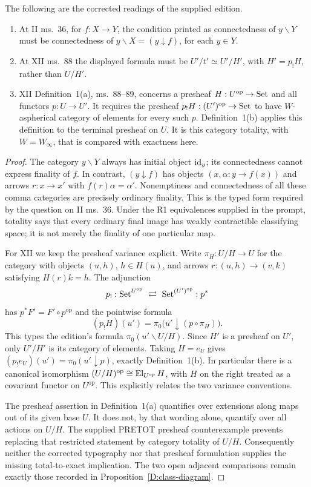 \begin{proposition}
\label{D:manuscript-types}
The following are the corrected readings of the supplied edition.
\begin{enumerate}[label=(\roman*)]
\item At II ms.\ 36, for $f:X\to Y$, the condition printed as
connectedness of $y\backslash Y$ must be connectedness of
$y\backslash X=(y\downarrow f)$, for each $y\in Y$.
\item At XII ms.\ 88 the displayed formula must be
$U'/t'\simeq U'/H'$, with $H'=p_!H$, rather than $U/H'$.
\item XII Definition~1(a), ms.\ 88--89, concerns a presheaf
$H:U^{\mathrm{op}}\to\mathrm{Set}$ and all functors $p:U\to U'$.
It requires the presheaf $p_!H:(U')^{\mathrm{op}}\to\mathrm{Set}$ to
have $W$-aspherical category of elements for every such $p$.
Definition~1(b) applies this definition to the terminal presheaf
on $U$. It is this category totality, with $W=W_\infty$, that
is compared with exactness here.
\end{enumerate}
\end{proposition}
\begin{proof}
The category $y\backslash Y$ always has initial object $\operatorname{id}_y$;
its connectedness cannot express finality of $f$. In contrast,
$(y\downarrow f)$ has objects $(x,\alpha:y\to f(x))$ and arrows
$r:x\to x'$ with $f(r)\alpha=\alpha'$. Nonemptiness and
connectedness of all these comma categories are precisely ordinary
finality. This is the typed form required by the question on
II ms.\ 36. Under the R1 equivalences supplied in the prompt,
totality says that every ordinary final image has weakly
contractible classifying space; it is not merely the finality of
one particular map.

For XII we keep the presheaf variance explicit. Write
$\pi_H:U/H\to U$ for the category with objects $(u,h)$,
$h\in H(u)$, and arrows $r:(u,h)\to(v,k)$ satisfying
$H(r)k=h$. The adjunction
\[
 p_!:\mathrm{Set}^{U^{\mathrm{op}}}
 \ \rightleftarrows\ \mathrm{Set}^{(U')^{\mathrm{op}}}:p^*
\]
has $p^*F'=F'\circ p^{\mathrm{op}}$ and the pointwise formula
\[
 (p_!H)(u')=\pi_0\bigl(u'\downarrow(p\circ\pi_H)\bigr).
\]
This types the edition's formula $\pi_0(u'\backslash U/H)$.
Since $H'$ is a presheaf on $U'$, only $U'/H'$ is its category
of elements. Taking $H=e_U$ gives
$(p_!e_U)(u')=\pi_0(u'\downarrow p)$, exactly Definition~1(b).
In particular there is a canonical isomorphism
$(U/H)^{\mathrm{op}}\cong\operatorname{El}_{U^{\mathrm{op}}}H$, with $H$
on the right treated as a covariant functor on $U^{\mathrm{op}}$.
This explicitly relates the two variance conventions.

The presheaf assertion in Definition~1(a) quantifies over
extensions along maps out of its given base $U$. It does not,
by that wording alone, quantify over all actions on $U/H$.
The supplied PRETOT presheaf counterexample prevents replacing
that restricted statement by category totality of $U/H$.
Consequently neither the corrected typography nor that
presheaf formulation supplies the missing total-to-exact
implication. The two open adjacent comparisons remain exactly
those recorded in Proposition~\ref{D:class-diagram}.
\end{proof}
